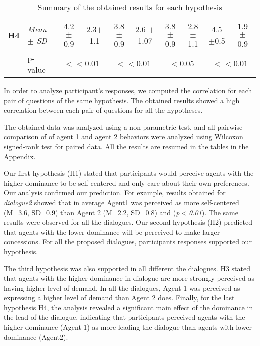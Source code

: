 \documentclass{llncs}
\begin{document}
\begin{table}[t]
\begin{tabular}{|ll|c|c|c|c|c|c|c|c|}
			
			\newline \multirow{2}{*} {\textbf{H4}} & \multicolumn{1}{|l|}{ \textit{Mean} $\pm$ \textit{SD} } & 4.2 $\pm$ 0.9 & 2.3$\pm$ 1.1  & 3.8 $\pm$0.9 & 2.6 $\pm$1.07 & 3.8 $\pm$0.9  & 2.8$\pm$ 1.1  & 4.5 $\pm$0.5  & 1.9 $\pm$ 0.9\\
			\cline{2-10}
			\newline & \multicolumn{1}{|l|}{p-value} & \multicolumn{2}{c|}{ $<<0.01$} & \multicolumn{2}{c|}{ $<<0.01$} & \multicolumn{2}{c|}{ $<0.05$}& \multicolumn{2}{c|}{ $<<0.01$}\\
			\hline	
		\end{tabular}
		\caption{Summary of the obtained results for each hypothesis}
	\end{table}
	In order to analyze participant's responses, we computed the correlation for each pair of questions of the same hypothesis. The obtained results showed a high correlation between each pair of questions for all the hypotheses.
	
	The obtained data was analyzed using a non parametric test, and all pairwise comparison of of agent 1 and agent 2 behaviors were analyzed using Wilcoxon signed-rank test for paired data. All the results are resumed in the tables in the Appendix.
	
	\par Our first hypothesis (H1) stated that participants would perceive agents with the higher dominance to be self-centered and only care about their own preferences. Our analysis confirmed our prediction. For example, results obtained for \textit{dialogue2} showed that in average Agent1 was perceived as more self-centered (M=3.6, SD=0.9) than Agent 2 (M=2.2, SD=0.8) and (\textit{p$<$0.01}). The same results were observed for all the dialogues. 
	Our second hypothesis (H2) predicted that agents with the lower dominance will be perceived to make larger concessions. For all the proposed dialogues, participants responses supported our hypothesis. 

	\par The third hypothesis was also supported in all different the dialogues. H3 stated that agents with the higher dominance in dialogue are more strongly perceived as having higher level of demand. In all the dialogues, Agent 1 was perceived as expressing a higher level of demand than Agent 2 does. 
	Finally, for the last hypothesis H4, the analysis revealed a significant main effect of the dominance in the lead of the dialogue, indicating that participants perceived agents with the higher dominance (Agent 1) as more leading the dialogue than agents with lower dominance (Agent2). 
	
\end{document}
